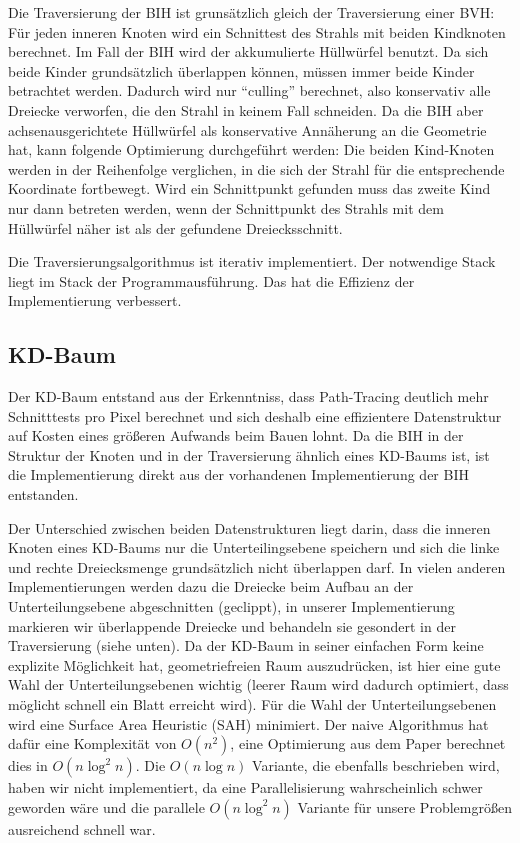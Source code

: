 Die Traversierung der BIH ist grunsätzlich gleich der Traversierung einer BVH: Für jeden inneren Knoten wird ein Schnittest des Strahls mit beiden Kindknoten berechnet. Im Fall der BIH wird der akkumulierte Hüllwürfel benutzt. Da sich beide Kinder grundsätzlich überlappen können, müssen immer beide Kinder betrachtet werden. Dadurch wird nur "`culling"' berechnet, also konservativ alle Dreiecke verworfen, die den Strahl in keinem Fall schneiden. Da die BIH aber achsenausgerichtete Hüllwürfel als konservative Annäherung an die Geometrie hat, kann folgende Optimierung durchgeführt werden: Die beiden Kind-Knoten werden in der Reihenfolge verglichen, in die sich der Strahl für die entsprechende Koordinate fortbewegt. Wird ein Schnittpunkt gefunden muss das zweite Kind nur dann betreten werden, wenn der Schnittpunkt des Strahls mit dem Hüllwürfel näher ist als der gefundene Dreiecksschnitt.

Die Traversierungsalgorithmus ist iterativ implementiert. Der notwendige Stack liegt im Stack der Programmausführung. Das hat die Effizienz der Implementierung verbessert.

\subsection{KD-Baum}
\label{ssec:kdtree}

Der KD-Baum entstand aus der Erkenntniss, dass Path-Tracing deutlich mehr Schnitttests pro Pixel berechnet und sich deshalb eine effizientere Datenstruktur auf Kosten eines größeren Aufwands beim Bauen lohnt. Da die BIH in der Struktur der Knoten und in der Traversierung ähnlich eines KD-Baums ist, ist die Implementierung direkt aus der vorhandenen Implementierung der BIH entstanden.

Der Unterschied zwischen beiden Datenstrukturen liegt darin, dass die inneren Knoten eines KD-Baums nur die Unterteilingsebene speichern und sich die linke und rechte Dreiecksmenge grundsätzlich nicht überlappen darf. In vielen anderen Implementierungen werden dazu die Dreiecke beim Aufbau an der Unterteilungsebene abgeschnitten (geclippt), in unserer Implementierung markieren wir überlappende Dreiecke und behandeln sie gesondert in der Traversierung (siehe unten). Da der KD-Baum in seiner einfachen Form keine explizite Möglichkeit hat, geometriefreien Raum auszudrücken, ist hier eine gute Wahl der Unterteilungsebenen wichtig (leerer Raum wird dadurch optimiert, dass möglicht schnell ein Blatt erreicht wird). Für die Wahl der Unterteilungsebenen wird eine Surface Area Heuristic (SAH) minimiert. Der naive Algorithmus hat dafür eine Komplexität von $O(n^2)$, eine Optimierung aus dem Paper berechnet dies in $O(n \log^2 n)$. Die $O(n \log n)$ Variante, die ebenfalls beschrieben wird, haben wir nicht implementiert, da eine Parallelisierung wahrscheinlich schwer geworden wäre und die parallele $O(n \log^2 n)$ Variante für unsere Problemgrößen ausreichend schnell war.

